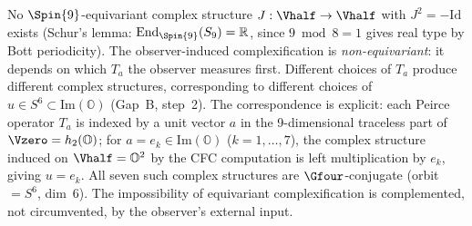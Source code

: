 \begin{remark}
\label{rem:impossibility-compat}
No $\Spin{9}$-equivariant complex structure $J: \Vhalf \to \Vhalf$
with $J^2 = -\mathrm{Id}$ exists (Schur's lemma:
$\mathrm{End}_{\Spin{9}}(S_9) = \mathbb{R}$, since
$9 \bmod 8 = 1$ gives real type by Bott periodicity).  The
observer-induced complexification is \emph{non-equivariant}: it
depends on which $T_a$ the observer measures first.  Different
choices of $T_a$ produce different complex structures, corresponding
to different choices of $u \in S^6 \subset \mathrm{Im}(\mathbb{O})$
(Gap~B, step~2).  The correspondence is explicit: each Peirce
operator $T_a$ is indexed by a unit vector $a$ in the
9-dimensional traceless part of $\Vzero = h_2(\mathbb{O})$; for
$a = e_k \in \mathrm{Im}(\mathbb{O})$ ($k=1,\ldots,7$), the
complex structure induced on $\Vhalf = \mathbb{O}^2$ by the
CFC computation is left multiplication by $e_k$, giving $u = e_k$.
All seven such complex structures are $\Gfour$-conjugate (orbit
$= S^6$, dim~6).
The impossibility of equivariant complexification
is complemented, not circumvented, by the observer's external input.
\end{remark}

